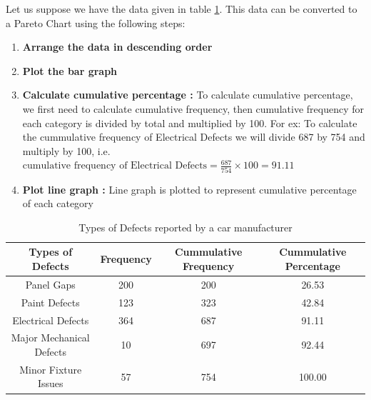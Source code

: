 \documentclass[twoside,12pt]{report}  %
\begin{document}
\begin{tcolorbox}[colback=blue!5!white, colframe=blue!75!black, title = \textbf{Pareto Chart}]
	
	Let us suppose we have the data given in table \ref{pareto_example_table}. This data can be converted to a Pareto Chart using the following steps:
	\begin{enumerate}
		\item \textbf{Arrange the data in descending order} 
		\item \textbf{Plot the bar graph} 
		\item \textbf{Calculate cumulative percentage :} To calculate cumulative percentage, we first need to calculate cumulative frequency, then cumulative frequency for each category is divided by total and multiplied by 100. For ex: To calculate the cummulative frequency of Electrical Defects we will divide 687 by 754 and multiply by 100, i.e. $ \mbox{cumulative frequency of Electrical Defects} = \frac{687}{754} \times 100 = 91.11 $
		\item \textbf{Plot line graph :} Line graph is plotted to represent cumulative percentage of each category	
	\end{enumerate}

	\begin{table}[H]
		\begin{centering}
			\begin{tabular}{c|c|c|c}
				\textbf{Types of   Defects} &\textbf{Frequency} &\textbf{Cummulative Frequency} &\textbf{Cummulative Percentage} \\
				\hline
				Panel Gaps                  & 200                & 200                              & 26.53 \\
				Paint Defects               & 123                & 323                              & 42.84 \\
				Electrical Defects          & 364                & 687                              & 91.11 \\
				Major Mechanical Defects    & 10                 & 697                              & 92.44 \\
				Minor Fixture Issues        & 57                 & 754                              & 100.00 \\        
			\end{tabular}
			\caption{Types of Defects reported by a car manufacturer}
			\label{pareto_example_table}
		\end{centering}
	\end{table}


\end{tcolorbox}
\end{document}
